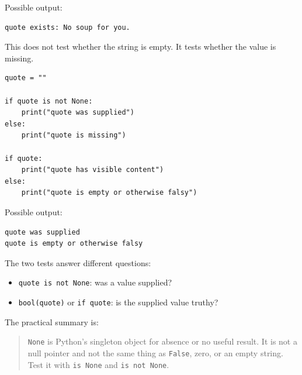 Possible output:

\begin{verbatim}
quote exists: No soup for you.
\end{verbatim}

This does not test whether the string is empty. It tests whether the value is missing.

\begin{verbatim}
quote = ""

if quote is not None:
    print("quote was supplied")
else:
    print("quote is missing")

if quote:
    print("quote has visible content")
else:
    print("quote is empty or otherwise falsy")
\end{verbatim}

Possible output:

\begin{verbatim}
quote was supplied
quote is empty or otherwise falsy
\end{verbatim}

The two tests answer different questions:

\begin{itemize}
    \item \texttt{quote is not None}: was a value supplied?
    \item \texttt{bool(quote)} or \texttt{if quote}: is the supplied value truthy?
\end{itemize}

The practical summary is:

\begin{quote}
\texttt{None} is Python's singleton object for absence or no useful result. It is not a null pointer and not the same thing as \texttt{False}, zero, or an empty string. Test it with \texttt{is None} and \texttt{is not None}.
\end{quote}